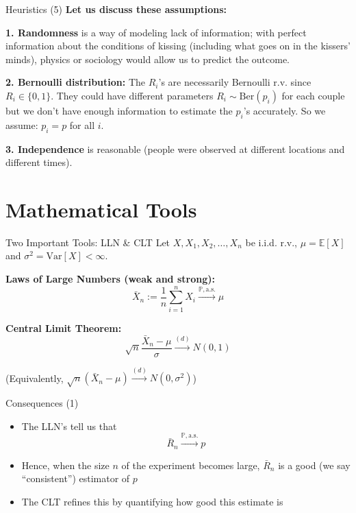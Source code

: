 \documentclass[aspectratio=169]{beamer}
\begin{document}
\begin{frame}{Heuristics (5)}
\textbf{Let us discuss these assumptions:}

\vspace{0.3cm}

\textbf{1. Randomness} is a way of modeling lack of information; with perfect information about the conditions of kissing (including what goes on in the kissers' minds), physics or sociology would allow us to predict the outcome.

\vspace{0.3cm}

\textbf{2. Bernoulli distribution:} The $R_i$'s are necessarily Bernoulli r.v. since $R_i \in \{0, 1\}$. They could have different parameters $R_i \sim \text{Ber}(p_i)$ for each couple but we don't have enough information to estimate the $p_i$'s accurately. So we assume: $p_i = p$ for all $i$.

\vspace{0.3cm}

\textbf{3. Independence} is reasonable (people were observed at different locations and different times).
\end{frame}

\section{Mathematical Tools}

\begin{frame}{Two Important Tools: LLN \& CLT}
Let $X, X_1, X_2, \ldots, X_n$ be i.i.d. r.v., $\mu = \mathbb{E}[X]$ and $\sigma^2 = \text{Var}[X] < \infty$.

\vspace{0.5cm}

\textbf{Laws of Large Numbers (weak and strong):}
\[\bar{X}_n := \frac{1}{n}\sum_{i=1}^{n}X_i \xrightarrow{\mathbb{P}, \text{a.s.}} \mu\]

\vspace{0.5cm}

\textbf{Central Limit Theorem:}
\[\sqrt{n}\frac{\bar{X}_n - \mu}{\sigma} \xrightarrow{(d)} N(0, 1)\]

(Equivalently, $\sqrt{n}(\bar{X}_n - \mu) \xrightarrow{(d)} N(0, \sigma^2)$)
\end{frame}

\begin{frame}{Consequences (1)}
\begin{itemize}
    \item The LLN's tell us that
    \[\bar{R}_n \xrightarrow{\mathbb{P}, \text{a.s.}} p\]

    \item Hence, when the size $n$ of the experiment becomes large, $\bar{R}_n$ is a good (we say ``consistent'') estimator of $p$

    \item The CLT refines this by quantifying how good this estimate is
\end{itemize}
\end{frame}
\end{document}
